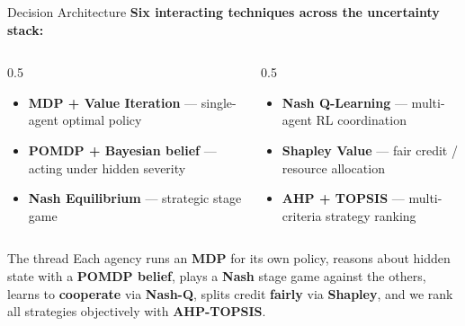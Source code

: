 \documentclass[aspectratio=169,11pt]{beamer}
\newcommand{\hl}[1]{{\color{accent}\textbf{#1}}}
\newcommand{\hg}[1]{{\color{good}\textbf{#1}}}
\begin{document}
\begin{frame}{Decision Architecture}
  \textbf{Six interacting techniques across the uncertainty stack:}
  \vspace{0.4em}
  \begin{columns}[T]
    \begin{column}{0.5\textwidth}
      \begin{itemize}
        \item \hl{MDP + Value Iteration} — single-agent optimal policy
        \item \hl{POMDP + Bayesian belief} — acting under hidden
              severity
        \item \hl{Nash Equilibrium} — strategic stage game
      \end{itemize}
    \end{column}
    \begin{column}{0.5\textwidth}
      \begin{itemize}
        \item \hl{Nash Q-Learning} — multi-agent RL coordination
        \item \hl{Shapley Value} — fair credit / resource allocation
        \item \hl{AHP + TOPSIS} — multi-criteria strategy ranking
      \end{itemize}
    \end{column}
  \end{columns}
  \vspace{0.6em}
  \begin{block}{The thread}
    Each agency runs an \hl{MDP} for its own policy, reasons about
    hidden state with a \hl{POMDP belief}, plays a \hl{Nash} stage
    game against the others, learns to \hg{cooperate} via
    \hl{Nash-Q}, splits credit \hl{fairly} via \hl{Shapley}, and we
    rank all strategies objectively with \hl{AHP-TOPSIS}.
  \end{block}
\end{frame}
\end{document}
